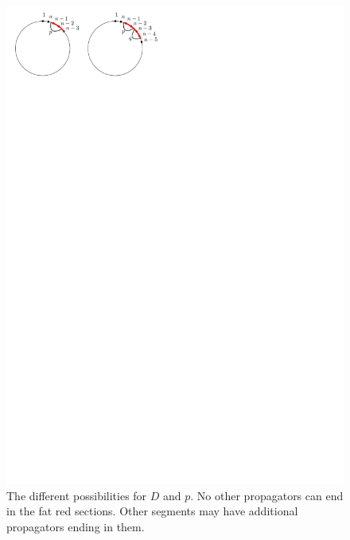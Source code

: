 \documentclass[11pt]{article}
\theoremstyle{remark}
\theoremstyle{definition}
\begin{document}
\begin{figure}
 \includegraphics{specialp}
  \caption{The different possibilities for $D$ and $p$.  No other propagators can end in the fat red sections.  Other segments may have additional propagators ending in them.}\label{fig special p}
\end{figure}
\end{document}
